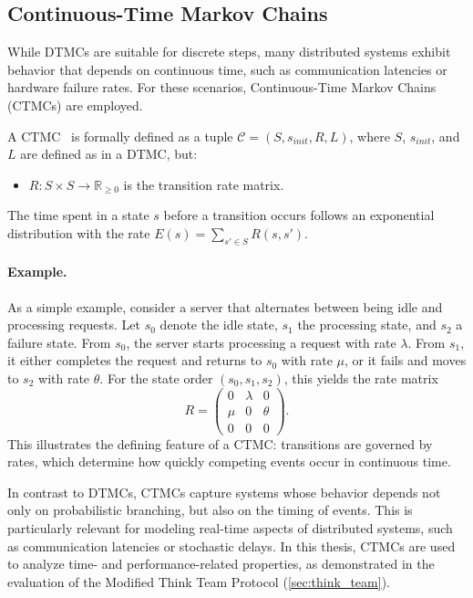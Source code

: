 \subsection*{Continuous-Time Markov Chains}
While DTMCs are suitable for discrete steps, many distributed systems exhibit behavior that depends on continuous time, such as communication latencies or hardware failure rates. For these scenarios, Continuous-Time Markov Chains (CTMCs) are employed. 

A CTMC~\cite{Baier2008Principles} is formally defined as a tuple 
$\mathcal{C} = (S, s_{\mathit{init}}, R, L)$, where $S$, $s_{\mathit{init}}$, and $L$ are defined as in a DTMC, but:
\begin{itemize}
	\item $R: S \times S \rightarrow \mathbb{R}_{\ge 0}$ is the transition rate matrix.
\end{itemize}
The time spent in a state $s$ before a transition occurs follows an exponential distribution with the rate $E(s) = \sum_{s' \in S} R(s, s')$.

\paragraph{Example.}
As a simple example, consider a server that alternates between being idle and processing requests. Let $s_0$ denote the idle state, $s_1$ the processing state, and $s_2$ a failure state. From $s_0$, the server starts processing a request with rate $\lambda$. From $s_1$, it either completes the request and returns to $s_0$ with rate $\mu$, or it fails and moves to $s_2$ with rate $\theta$.
For the state order $(s_0, s_1, s_2)$, this yields the rate matrix
\[
R =
\begin{pmatrix}
	0 & \lambda & 0 \\
	\mu & 0 & \theta \\
	0 & 0 & 0
\end{pmatrix}.
\]
This illustrates the defining feature of a CTMC: transitions are governed by rates, which determine how quickly competing events occur in continuous time.

In contrast to DTMCs, CTMCs capture systems whose behavior depends not only on probabilistic branching, but also on the timing of events. This is particularly relevant for modeling real-time aspects of distributed systems, such as communication latencies or stochastic delays. In this thesis, CTMCs are used to analyze time- and performance-related properties, as demonstrated in the evaluation of the Modified Think Team Protocol (\cref{sec:think_team}).

